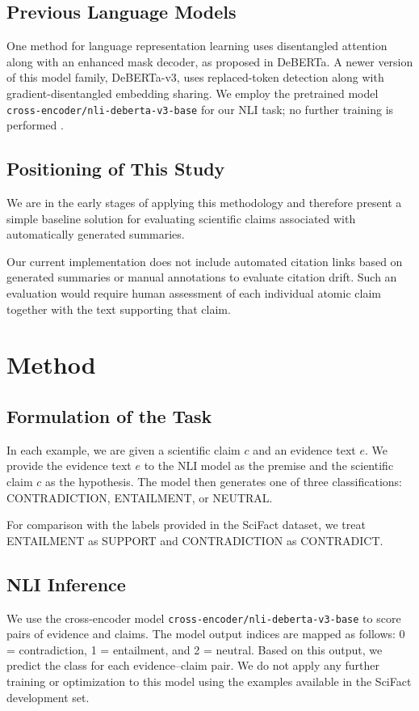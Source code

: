 \documentclass[conference]{IEEEtran}
\begin{document}
\subsection{Previous Language Models}
One method for language representation learning uses disentangled attention along with an enhanced mask decoder, as proposed in DeBERTa. A newer version of this model family, DeBERTa-v3, uses replaced-token detection along with gradient-disentangled embedding sharing. We employ the pretrained model \texttt{cross-encoder/nli-deberta-v3-base} for our NLI task; no further training is performed \cite{he2021deberta,he2023debertav3}.

\subsection{Positioning of This Study}
We are in the early stages of applying this methodology and therefore present a simple baseline solution for evaluating scientific claims associated with automatically generated summaries.

Our current implementation does not include automated citation links based on generated summaries or manual annotations to evaluate citation drift. Such an evaluation would require human assessment of each individual atomic claim together with the text supporting that claim.

\section{Method}

\subsection{Formulation of the Task}
In each example, we are given a scientific claim $c$ and an evidence text $e$. We provide the evidence text $e$ to the NLI model as the premise and the scientific claim $c$ as the hypothesis. The model then generates one of three classifications: CONTRADICTION, ENTAILMENT, or NEUTRAL.

For comparison with the labels provided in the SciFact dataset, we treat ENTAILMENT as SUPPORT and CONTRADICTION as CONTRADICT.

\subsection{NLI Inference}
We use the cross-encoder model \texttt{cross-encoder/nli-deberta-v3-base} to score pairs of evidence and claims. The model output indices are mapped as follows: 0 = contradiction, 1 = entailment, and 2 = neutral. Based on this output, we predict the class for each evidence--claim pair. We do not apply any further training or optimization to this model using the examples available in the SciFact development set.
\end{document}
